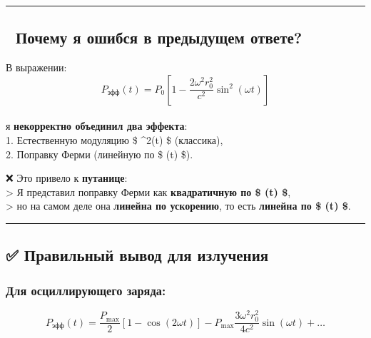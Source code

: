 \documentclass[11pt]{article}
\begin{document}
\begin{center}\rule{0.5\linewidth}{\linethickness}\end{center}

\subsection{🔁 Почему я ошибся в предыдущем
ответе?}\label{ux43fux43eux447ux435ux43cux443-ux44f-ux43eux448ux438ux431ux441ux44f-ux432-ux43fux440ux435ux434ux44bux434ux443ux449ux435ux43c-ux43eux442ux432ux435ux442ux435-2}

В выражении:\\
\[
P_{\text{эфф}}(t) = P_0 \left[ 1 - \frac{2\omega^2 r_0^2}{c^2} \sin^2(\omega t) \right]
\]\\
я \textbf{некорректно объединил два эффекта}:\\
1. Естественную модуляцию \$ \sin\^{}2(\omega t) \$ (классика),\\
2. Поправку Ферми (линейную по \$ \sin(\omega t) \$).

❌ Это привело к \textbf{путанице}:\\
\textgreater{} Я представил поправку Ферми как \textbf{квадратичную по
\$ \sin(\omega t) \$},\\
\textgreater{} но на самом деле она \textbf{линейна по ускорению}, то
есть \textbf{линейна по \$ \sin(\omega t) \$}.

\begin{center}\rule{0.5\linewidth}{\linethickness}\end{center}

\subsection{✅ Правильный вывод для
излучения}\label{ux43fux440ux430ux432ux438ux43bux44cux43dux44bux439-ux432ux44bux432ux43eux434-ux434ux43bux44f-ux438ux437ux43bux443ux447ux435ux43dux438ux44f}

\subsubsection{Для осциллирующего
заряда:}\label{ux434ux43bux44f-ux43eux441ux446ux438ux43bux43bux438ux440ux443ux44eux449ux435ux433ux43e-ux437ux430ux440ux44fux434ux430}

\[
\boxed{
P_{\text{эфф}}(t) = \frac{P_{\text{max}}}{2} \left[ 1 - \cos(2\omega t) \right] - P_{\text{max}} \frac{3\omega^2 r_0^2}{4c^2} \sin(\omega t) + \dots
}
\]
\end{document}
